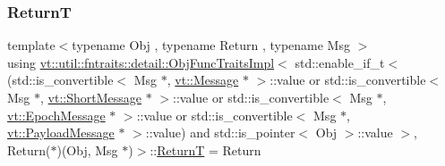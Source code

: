 \subsubsection{\texorpdfstring{ReturnT}{ReturnT}}
{\footnotesize\ttfamily template$<$typename Obj , typename Return , typename Msg $>$ \\
using \hyperlink{structvt_1_1util_1_1fntraits_1_1detail_1_1_obj_func_traits_impl}{vt\+::util\+::fntraits\+::detail\+::\+Obj\+Func\+Traits\+Impl}$<$ std\+::enable\+\_\+if\+\_\+t$<$(std\+::is\+\_\+convertible$<$ Msg $\ast$, \hyperlink{namespacevt_a3a3ddfef40b4c90915fa43cdd5f129ea}{vt\+::\+Message} $\ast$ $>$\+::value or std\+::is\+\_\+convertible$<$ Msg $\ast$, \hyperlink{namespacevt_a1125ac1da6c0bbf141e0ea0739d7602d}{vt\+::\+Short\+Message} $\ast$ $>$\+::value or std\+::is\+\_\+convertible$<$ Msg $\ast$, \hyperlink{namespacevt_ad67368ffae52d7325002586b41bb150e}{vt\+::\+Epoch\+Message} $\ast$ $>$\+::value or std\+::is\+\_\+convertible$<$ Msg $\ast$, \hyperlink{namespacevt_a89a92229c5622b855c02c549f83a1a68}{vt\+::\+Payload\+Message} $\ast$ $>$\+::value) and std\+::is\+\_\+pointer$<$ Obj $>$\+::value $>$, Return($\ast$)(Obj, Msg $\ast$)$>$\+::\hyperlink{structvt_1_1util_1_1fntraits_1_1detail_1_1_obj_func_traits_impl_3_01std_1_1enable__if__t_3_07std893b55e280057f64eb5acd3df924485e_a787619e304f142c09aec7d5c6365ebeb}{ReturnT} =  Return}

